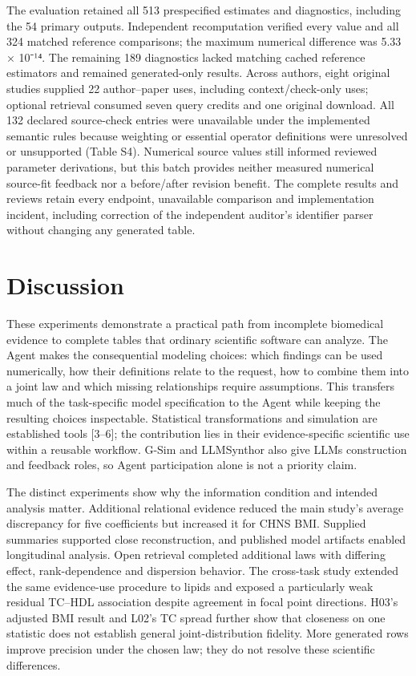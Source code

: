 \documentclass[10pt,twocolumn]{article}
\begin{document}
The evaluation retained all 513 prespecified estimates and diagnostics, including the 54 primary outputs. Independent recomputation verified every value and all 324 matched reference comparisons; the maximum numerical difference was 5.33 × 10⁻¹⁴. The remaining 189 diagnostics lacked matching cached reference estimators and remained generated-only results. Across authors, eight original studies supplied 22 author–paper uses, including context/check-only uses; optional retrieval consumed seven query credits and one original download. All 132 declared source-check entries were unavailable under the implemented semantic rules because weighting or essential operator definitions were unresolved or unsupported (Table S4). Numerical source values still informed reviewed parameter derivations, but this batch provides neither measured numerical source-fit feedback nor a before/after revision benefit. The complete results and reviews retain every endpoint, unavailable comparison and implementation incident, including correction of the independent auditor's identifier parser without changing any generated table.


\section{Discussion}

These experiments demonstrate a practical path from incomplete biomedical evidence to complete tables that ordinary scientific software can analyze. The Agent makes the consequential modeling choices: which findings can be used numerically, how their definitions relate to the request, how to combine them into a joint law and which missing relationships require assumptions. This transfers much of the task-specific model specification to the Agent while keeping the resulting choices inspectable. Statistical transformations and simulation are established tools [3–6]; the contribution lies in their evidence-specific scientific use within a reusable workflow. G-Sim and LLMSynthor also give LLMs construction and feedback roles, so Agent participation alone is not a priority claim.


The distinct experiments show why the information condition and intended analysis matter. Additional relational evidence reduced the main study's average discrepancy for five coefficients but increased it for CHNS BMI. Supplied summaries supported close reconstruction, and published model artifacts enabled longitudinal analysis. Open retrieval completed additional laws with differing effect, rank-dependence and dispersion behavior. The cross-task study extended the same evidence-use procedure to lipids and exposed a particularly weak residual TC–HDL association despite agreement in focal point directions. H03's adjusted BMI result and L02's TC spread further show that closeness on one statistic does not establish general joint-distribution fidelity. More generated rows improve precision under the chosen law; they do not resolve these scientific differences.
\end{document}
